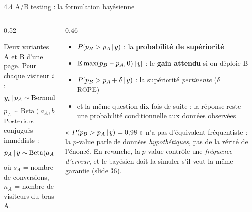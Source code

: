 \begin{frame}{4.4 A/B testing : la formulation bayésienne}
\footnotesize
\begin{columns}[t]
\begin{column}{0.52\textwidth}
\begin{ebox}
Deux variantes A et B d'une page. Pour chaque visiteur $i$ :
\[
y_i \,\vert\, p_A \sim \mathrm{Bernoulli}(p_A) \quad \text{ou} \quad
y_i \,\vert\, p_B \sim \mathrm{Bernoulli}(p_B)
\]
\[
p_A \sim \mathrm{Beta}(a_A, b_A), \qquad p_B \sim \mathrm{Beta}(a_B, b_B)
\]
Posteriors conjugués immédiats :
\[
p_A \,\vert\, y \sim \mathrm{Beta}(a_A + s_A,\, b_A + n_A - s_A)
\]
où $s_A$ = nombre de conversions, $n_A$ = nombre de visiteurs du bras A.
\end{ebox}
\end{column}
\begin{column}{0.46\textwidth}
\begin{kbox}
\begin{itemize}
  \item $P(p_B > p_A \,\vert\, y)$ : la \textbf{probabilité de supériorité}
  \item $\mathbb{E}[\max(p_B - p_A, 0) \,\vert\, y]$ : le \textbf{gain attendu} si on
        déploie B
  \item $P(p_B > p_A + \delta \,\vert\, y)$ : la supériorité
        \emph{pertinente} ($\delta$ = ROPE)
  \item et la même question dix fois de suite : la réponse reste une
        probabilité conditionnelle aux données observées
\end{itemize}
\end{kbox}
\begin{wbox}
« $P(p_B > p_A \,\vert\, y) = 0{,}98$ » n'a pas d'équivalent fréquentiste :
la $p$-value parle de données \emph{hypothétiques}, pas de la vérité de
l'énoncé. En revanche, la $p$-value contrôle une \emph{fréquence d'erreur},
et le bayésien doit la simuler s'il veut la même garantie (slide 36).
\end{wbox}
\end{column}
\end{columns}
\end{frame}

